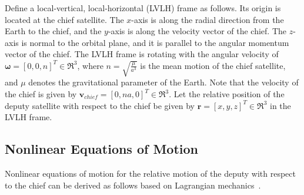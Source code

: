 Define a local-vertical, local-horizontal (LVLH) frame as follows. Its origin is located at the chief satellite. The $x$-axis is along the radial direction from the Earth to the chief, and the $y$-axis is along the velocity vector of the chief. The $z$-axis is normal to the orbital plane, and it is parallel to the angular momentum vector of the chief. The LVLH frame is rotating with the angular velocity of $\mathbf{\omega}=[0,0,n]^T\in\Re^3$, where $n=\sqrt{\frac{\mu}{a^3}}$ is the mean motion of the chief satellite, and $\mu$ denotes the gravitational parameter of the Earth. Note that the velocity of the chief is given by $\mathbf{v}_{chief}=[0,na,0]^T\in\Re^3$. Let the relative position of the deputy satellite with respect to the chief be given by $\mathbf{r}=[x,y,z]^T\in\Re^3$ in the LVLH frame. 

\subsection{Nonlinear Equations of Motion}

Nonlinear equations of motion for the relative motion of the deputy with respect to the chief can be derived as follows based on Lagrangian mechanics~\cite{LovLeePISSFD14}. 

